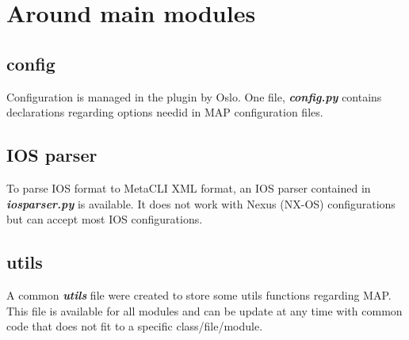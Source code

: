 \section{Around main modules}
\subsection{config}
Configuration is managed in the plugin by Oslo. One file, \emph{\textbf{config.py}} contains declarations regarding options needid in MAP configuration files.
\subsection{IOS parser}
To parse IOS format to MetaCLI XML format, an IOS parser contained in \emph{\textbf{iosparser.py}} is available. It does not work with Nexus (NX-OS) configurations but can accept most IOS configurations.
\subsection{utils}
A common \emph{\textbf{utils}} file were created to store some utils functions regarding MAP. This file is available for all modules and can be update at any time with common code that does not fit to a specific class/file/module.


